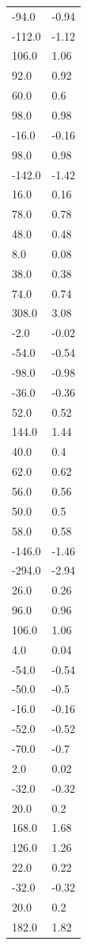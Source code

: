\begin{longtable}{ll}
-94.0 & -0.94 \\
-112.0 & -1.12 \\
106.0 & 1.06 \\
92.0 & 0.92 \\
60.0 & 0.6 \\
98.0 & 0.98 \\
-16.0 & -0.16 \\
98.0 & 0.98 \\
-142.0 & -1.42 \\
16.0 & 0.16 \\
78.0 & 0.78 \\
48.0 & 0.48 \\
8.0 & 0.08 \\
38.0 & 0.38 \\
74.0 & 0.74 \\
308.0 & 3.08 \\
-2.0 & -0.02 \\
-54.0 & -0.54 \\
-98.0 & -0.98 \\
-36.0 & -0.36 \\
52.0 & 0.52 \\
144.0 & 1.44 \\
40.0 & 0.4 \\
62.0 & 0.62 \\
56.0 & 0.56 \\
50.0 & 0.5 \\
58.0 & 0.58 \\
-146.0 & -1.46 \\
-294.0 & -2.94 \\
26.0 & 0.26 \\
96.0 & 0.96 \\
106.0 & 1.06 \\
4.0 & 0.04 \\
-54.0 & -0.54 \\
-50.0 & -0.5 \\
-16.0 & -0.16 \\
-52.0 & -0.52 \\
-70.0 & -0.7 \\
2.0 & 0.02 \\
-32.0 & -0.32 \\
20.0 & 0.2 \\
168.0 & 1.68 \\
126.0 & 1.26 \\
22.0 & 0.22 \\
-32.0 & -0.32 \\
20.0 & 0.2 \\
182.0 & 1.82 \\

\end{longtable}
